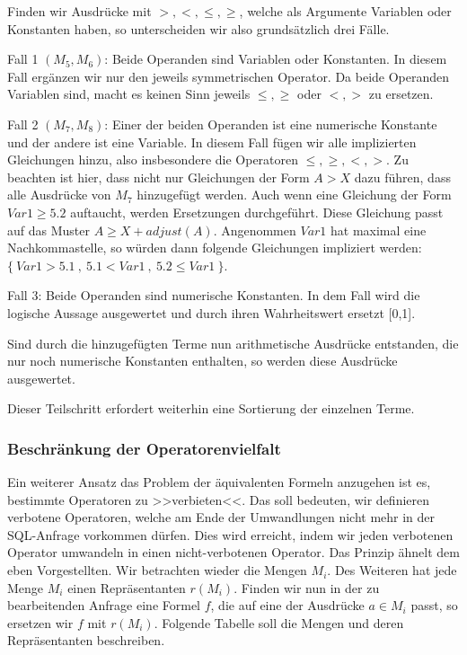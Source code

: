 Finden wir Ausdrücke mit $>,<,\leq,\geq$, welche als Argumente Variablen oder Konstanten haben, so unterscheiden wir also grundsätzlich drei Fälle.

Fall 1 $(M_5,M_6)$: Beide Operanden sind Variablen oder Konstanten. In diesem Fall ergänzen wir nur den jeweils symmetrischen Operator. Da beide Operanden Variablen sind, macht es keinen Sinn jeweils $\leq,\geq$ oder $<,>$ zu ersetzen.

Fall 2 $(M_7,M_8)$: Einer der beiden Operanden ist eine numerische Konstante und der andere ist eine Variable. In diesem Fall fügen wir alle implizierten Gleichungen hinzu, also insbesondere die Operatoren $\leq,\geq,<,>$. Zu beachten ist hier, dass nicht nur Gleichungen der Form $A>X$ dazu führen, dass alle Ausdrücke von $M_7$ hinzugefügt werden. Auch wenn eine Gleichung der Form $Var1\geq 5.2$ auftaucht, werden Ersetzungen durchgeführt. Diese Gleichung passt auf das Muster $A\geq X+\mathit{adjust}(A)$. Angenommen $Var1$ hat maximal eine Nachkommastelle, so würden dann folgende Gleichungen impliziert werden: $\{\ Var1>5.1\ ,\ 5.1<Var1\ ,\ 5.2 \leq Var1\ \}$.

Fall 3: Beide Operanden sind numerische Konstanten. In dem Fall wird die logische Aussage ausgewertet und durch ihren Wahrheitswert ersetzt [0,1].

Sind durch die hinzugefügten Terme nun arithmetische Ausdrücke entstanden, die nur noch numerische Konstanten enthalten, so werden diese Ausdrücke ausgewertet.

Dieser Teilschritt erfordert weiterhin eine Sortierung der einzelnen Terme.

\subsubsection{Beschränkung der Operatorenvielfalt}

Ein weiterer Ansatz das Problem der äquivalenten Formeln anzugehen ist es, bestimmte Operatoren zu >>verbieten<<. Das soll bedeuten, wir definieren verbotene Operatoren, welche am Ende der Umwandlungen nicht mehr in der SQL-Anfrage vorkommen dürfen. Dies wird erreicht, indem wir jeden verbotenen Operator umwandeln in einen nicht-verbotenen Operator. Das Prinzip ähnelt dem eben Vorgestellten. Wir betrachten wieder die Mengen $M_i$. Des Weiteren hat jede Menge $M_i$ einen Repräsentanten $r(M_i)$. Finden wir nun in der zu bearbeitenden Anfrage eine Formel $f$, die auf eine der Ausdrücke $a\in M_i$ passt, so ersetzen wir $f$ mit $r(M_i)$. Folgende Tabelle soll die Mengen und deren Repräsentanten beschreiben.

